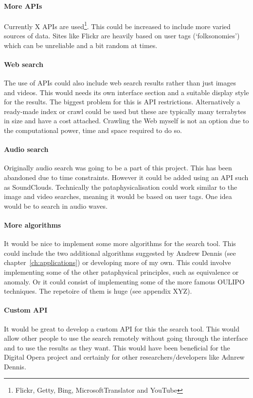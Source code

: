 \documentclass[11pt]{thesis} %
\begin{document}
\paragraph{More APIs} 
Currently X \ac{API}s are used\footnote{Flickr, Getty, Bing, MicrosoftTranslator and YouTube}. This could be increased to include more varied sources of data. Sites like Flickr are heavily based on user tags (`folksonomies') which can be unreliable and a bit random at times.

\paragraph{Web search} 
The use of \ac{API}s could also include web search results rather than just images and videos. This would needs its own interface section and a suitable display style for the results. The biggest problem for this is \ac{API} restrictions. Alternatively a ready-made index or crawl could be used but these are typically many terrabytes in size and have a cost attached. Crawling the Web myself is not an option due to the computational power, time and space required to do so.

\paragraph{Audio search} 
Originally audio search was going to be a part of this project. This has been abandoned due to time constraints. However it could be added using an \ac{API} such as SoundClouds. Technically the pataphysicalisation could work similar to the image and video searches, meaning it would be based on user tags. One idea would be to search in audio waves.



\paragraph{More algorithms} 
It would be nice to implement some more algorithms for the search tool. This could include the two additional algorithms suggested by Andrew Dennis (see chapter~\ref{ch:applications}) or developing more of my own. This could involve implementing some of the other pataphysical principles, such as equivalence or anomaly. Or it could consist of implementing some of the more famous \ac{OULIPO} techniques. The repetoire of them is huge (see appendix XYZ).



\paragraph{Custom API}
It would be great to develop a custom \ac{API} for this the search tool. This would allow other people to use the search remotely without going through the interface and to use the results as they want. This would have been beneficial for the Digital Opera project and certainly for other researchers/developers like Adnrew Dennis.
\end{document}
